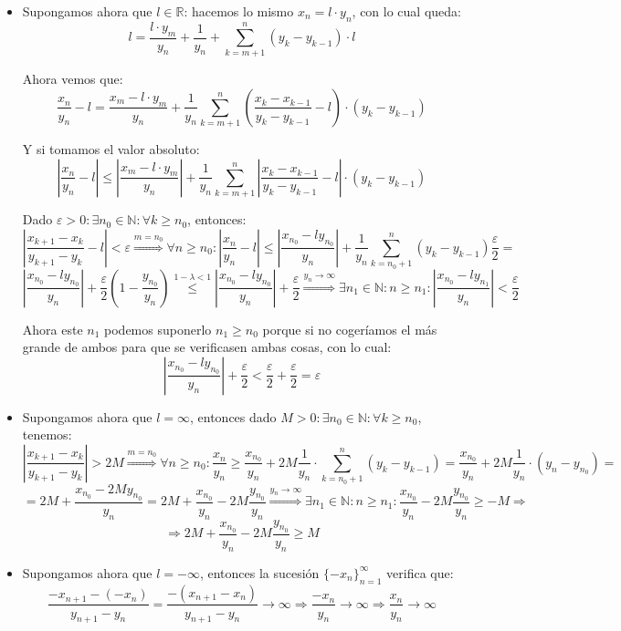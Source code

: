 \documentclass[10pt,a4paper,openright]{book}
\begin{document}
\begin{itemize}
\item Supongamos ahora que $l\in \mathbb R$: hacemos lo mismo $x_n=l\cdot y_n$, con lo cual queda:
$$l=\frac{l\cdot y_m}{y_n}+\frac{1}{y_n}+\sum_{k=m+1}^n (y_k-y_{k-1})\cdot l$$

Ahora vemos que:
$$\frac{x_n}{y_n}-l=\frac{x_m-l\cdot y_m}{y_n}+\frac{1}{y_n}\sum_{k=m+1}^n \left(\frac{x_k-x_{k-1}}{y_k-y_{k-1}}-l\right)\cdot (y_k-y_{k-1})$$

Y si tomamos el valor absoluto:
$$\left|\frac{x_n}{y_n}-l\right|\leq \left|\frac{x_m-l\cdot y_m}{y_n}\right|+\frac{1}{y_n}\sum_{k=m+1}^n \left|\frac{x_k-x_{k-1}}{y_k-y_{k-1}}-l\right|\cdot (y_k-y_{k-1})$$

Dado $\varepsilon>0: \exists n_0\in \mathbb N: \forall k\geq n_0$, entonces:
$$\left|\frac{x_{k+1}-x_k}{y_{k+1}-y_k}-l\right|<\varepsilon\stackrel{m=n_0}{\Rightarrow} \forall n\geq n_0: \left|\frac{x_n}{y_n}-l\right|\leq \left|\frac{x_{n_0}-ly_{n_0}}{y_n}\right|+\frac{1}{y_n}\sum_{k=n_0+1}^n (y_k-y_{k-1})\frac{\varepsilon}{2}=$$
$$\left|\frac{x_{n_0}-ly_{n_0}}{y_n}\right|+\frac{\varepsilon}{2}\left(1-\frac{y_{n_0}}{y_n}\right)\stackrel{1-\lambda<1}{\leq} \left|\frac{x_{n_0}-ly_{n_0}}{y_n}\right|+\frac{\varepsilon}{2}\stackrel{y_n\rightarrow\infty}{\Rightarrow} \exists n_1\in \mathbb N: n\geq n_1: \left|\frac{x_{n_0}-ly_{n_1}}{y_n}\right|<\frac{\varepsilon}{2}$$

Ahora este $n_1$ podemos suponerlo $n_1\geq n_0$ porque si no cogeríamos el más grande de ambos para que se verificasen ambas cosas, con lo cual:
$$\left|\frac{x_{n_0}-ly_{n_0}}{y_n}\right|+\frac{\varepsilon}{2}<\frac{\varepsilon}{2}+\frac{\varepsilon}{2}=\varepsilon $$

\item Supongamos ahora que $l=\infty$, entonces dado $M>0: \exists n_0\in \mathbb N: \forall k\geq n_0$, tenemos:
$$\left|\frac{x_{k+1}-x_{k}}{y_{k+1}-y_k}\right|>2M\stackrel{m=n_0}{\Rightarrow} \forall n\geq n_0: \frac{x_n}{y_n}\geq \frac{x_{n_0}}{y_n}+ 2M\frac{1}{y_n}\cdot \sum_{k=n_0+1}^n (y_k-y_{k-1})=\frac{x_{n_0}}{y_n}+ 2M\frac{1}{y_n}\cdot (y_n-y_{n_0})=$$
$$=2M + \frac{x_{n_0}-2My_{n_0}}{y_n}=2M + \frac{x_{n_0}}{y_n}-2M\frac{y_{n_0}}{y_n}\stackrel{y_n\rightarrow \infty}{\Rightarrow} \exists n_1\in \mathbb N: n\geq n_1: \frac{x_{n_0}}{y_n}-2M\frac{y_{n_0}}{y_n}\geq -M\Rightarrow $$
$$\Rightarrow 2M + \frac{x_{n_0}}{y_n}-2M\frac{y_{n_0}}{y_n}\geq M$$

\item Supongamos ahora que $l=-\infty$, entonces la sucesión $\{-x_n\}_{n=1}^\infty$ verifica que:
$$\frac{-x_{n+1}-(-x_n)}{y_{n+1}-y_n}=\frac{-(x_{n+1}-x_n)}{y_{n+1}-y_n} \rightarrow\infty \Rightarrow \frac{-x_n}{y_n}\rightarrow \infty\Rightarrow \frac{x_n}{y_n}\rightarrow \infty$$

\end{itemize}
\end{document}
